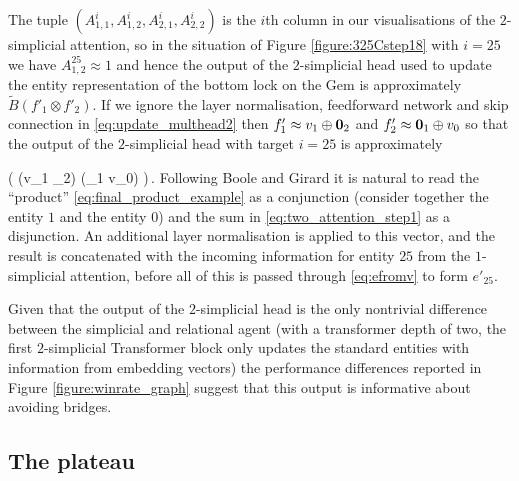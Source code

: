 \documentclass{article} %
\begin{document}
The tuple $(A^i_{1,1}, A^i_{1,2}, A^i_{2,1}, A^i_{2,2})$ is the $i$th column in our visualisations of the $2$-simplicial attention, so in the situation of Figure \ref{figure:325Cstep18} with $i = 25$ we have $A^{25}_{1,2} \approx 1$ and hence the output of the $2$-simplicial head used to update the entity representation of the bottom lock on the Gem is approximately $\widetilde{B}( f'_1 \otimes f'_2 )$. If we ignore the layer normalisation, feedforward network and skip connection in \eqref{eq:update_multhead2} then $f'_1 \approx v_{1} \oplus \bold{0}_2$ and $f'_2 \approx \bold{0}_1 \oplus v_0$ so that the output of the $2$-simplicial head with target $i = 25$ is approximately

\be\label{eq:final_product_example}
( (v_{1} \oplus {}_2) \otimes (_1 \oplus v_0) )\,.
\ee
Following Boole \citep{boole} and Girard \citep{girard_llogic} it is natural to read the ``product'' \eqref{eq:final_product_example} as a conjunction (consider together the entity $1$ and the entity $0$) and the sum in \eqref{eq:two_attention_step1} as a disjunction. An additional layer normalisation is applied to this vector, and the result is concatenated with the incoming information for entity $25$ from the $1$-simplicial attention, before all of this is passed through \eqref{eq:efromv} to form $e'_{25}$. 

Given that the output of the $2$-simplicial head is the only nontrivial difference between the simplicial and relational agent (with a transformer depth of two, the first $2$-simplicial Transformer block only updates the standard entities with information from embedding vectors) the performance differences reported in Figure \ref{figure:winrate_graph} suggest that this output is informative about avoiding bridges.

\subsection{The plateau}
\end{document}
